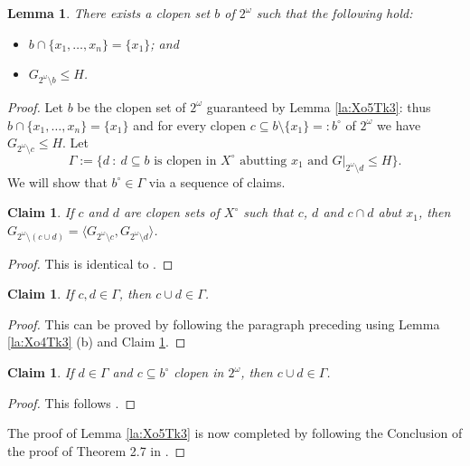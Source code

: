 \documentclass[12pt,a4paper,reqno]{amsart}
\numberwithin{equation}{section}
\theoremstyle{plain}
\newtheorem{lem}[thm]{Lemma}
\newtheorem{claim}[thm]{Claim}
\theoremstyle{definition}
\newcommand*{\proofclaimname}{Proof}
\newenvironment{proofclaim}[1][\proofclaimname]{\begin{proof}[#1]\renewcommand*{\qedsymbol}{\(\diamond\)}}{\end{proof}}
\newcommand{\st}{\: :\:}
\begin{document}
\begin{lem}
\label{la:Xo6Tk3}
 There exists a clopen set $b$ of  $2^\omega$ such that the following hold:
\begin{itemize}
\item
$b\cap \{x_1,\dots,x_n\} = \{x_1\}$; and
\item
$G_{2^\omega\setminus b}\leq H$.
\end{itemize}
\end{lem}


\begin{proof}
 Let $b$ be the clopen set of $2^\omega$ guaranteed by Lemma \ref{la:Xo5Tk3}: thus $b\cap \{x_1,\dots,x_n\} = \{x_1\}$ and  
 for every clopen $c\subseteq b\setminus\{x_1\} =: b^\circ$ of $2^\omega$ we have $G_{2^\omega\setminus c}\leq H$.
 Let
\[
\Gamma:= \{ d \st d\subseteq b \text{ is clopen in } X^\circ \text{ abutting } x_1 \text{ and } G|_{2^\omega\setminus d} \leq H\}.
\]
 We will show that $b^\circ\in \Gamma$ via a sequence of claims.


\begin{claim}
\label{cl:Xo62Tk3}
If $c$ and $d$ are clopen sets of $X^\circ$ such that $c$, $d$ and $c\cap d$ abut $x_1$, then
$G_{2^\omega\setminus (c\cup d)} =\langle G_{2^\omega\setminus c},G_{2^\omega\setminus d}\rangle$.
\end{claim}

\begin{proofclaim}
This is identical to \cite[Lemma 2.6]{Tr:IPG2}.
\end{proofclaim}




\begin{claim}
\label{cl:Xo63Tk3}
If $c,d\in\Gamma$, then $c\cup d\in\Gamma$.
\end{claim}

\begin{proofclaim}
 This can be proved by following the paragraph preceding \cite[Lemma 2.9]{Tr:IPG2} using
 Lemma \ref{la:Xo4Tk3} (b) and Claim \ref{cl:Xo62Tk3}.
\end{proofclaim}


\begin{claim}
\label{cl:Xo64Tk3}
 If $d\in\Gamma$ and $c\subseteq b^\circ$ clopen in $2^\omega$, then $c\cup d\in\Gamma$.
\end{claim}


\begin{proofclaim}
This follows \cite[Lemma 2.9]{Tr:IPG2}.
\end{proofclaim}

The proof of Lemma \ref{la:Xo5Tk3} is now completed by following
 the Conclusion of the proof of  Theorem 2.7 in \cite[p. 501, 502]{Tr:IPG2}.
\end{proof}
\end{document}
